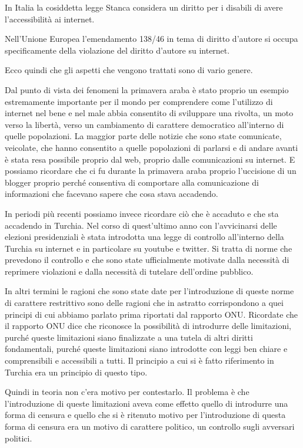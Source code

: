 In Italia la cosiddetta legge Stanca considera un diritto per i disabili di avere l'accessibilità ai internet.\par
Nell'Unione Europea l'emendamento 138/46 in tema di diritto d'autore si occupa specificamente della violazione del diritto d'autore su internet.\par
Ecco quindi che gli aspetti che vengono trattati sono di vario genere.\par
Dal punto di vista dei fenomeni la primavera araba è stato proprio un esempio estremamente importante per il mondo per comprendere come l'utilizzo di internet nel bene e nel male abbia consentito di sviluppare una rivolta, un moto verso la libertà, verso un cambiamento di carattere democratico all'interno di quelle popolazioni. La maggior parte delle notizie che sono state comunicate, veicolate, che hanno consentito a quelle popolazioni di parlarsi e di andare avanti è stata resa possibile proprio dal web, proprio dalle comunicazioni su internet. E possiamo ricordare che ci fu durante la primavera araba proprio l'uccisione di un blogger proprio perché consentiva di comportare alla comunicazione di informazioni che facevano sapere che cosa stava accadendo. \par
In periodi più recenti possiamo invece ricordare ciò che è accaduto e che sta accadendo in Turchia. Nel corso di quest'ultimo anno con l'avvicinarsi delle elezioni presidenziali è stata introdotta una legge di controllo all'interno della Turchia su internet e in particolare su youtube e twitter. Si tratta di norme che prevedono il controllo e che sono state ufficialmente motivate dalla necessità di reprimere violazioni e dalla necessità di tutelare dell'ordine pubblico.\par
In altri termini le ragioni che sono state date per l'introduzione di queste norme di carattere restrittivo sono delle ragioni che in astratto corrispondono a quei principi di cui abbiamo parlato prima riportati dal rapporto ONU. Ricordate che il rapporto ONU dice che riconosce la possibilità di introdurre delle limitazioni, purché queste limitazioni siano finalizzate a una tutela di altri diritti fondamentali, purché queste limitazioni siano introdotte con leggi ben chiare e comprensibili e accessibili a tutti. Il principio a cui si è fatto riferimento in Turchia era un principio di questo tipo.\par
Quindi in teoria non c'era motivo per contestarlo. Il problema è che l'introduzione di queste limitazioni aveva come effetto quello di introdurre una forma di censura e quello che si è ritenuto motivo per l'introduzione di questa forma di censura era un motivo di carattere politico, un controllo sugli avversari politici.\par
